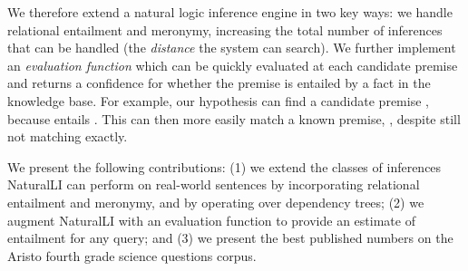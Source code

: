 We therefore extend a natural logic inference engine in two key ways:
  we handle relational entailment 
  and meronymy, increasing the total number of inferences that can be handled
  (the \textit{distance} the system can search).
We further implement an \textit{evaluation function} which can be quickly
  evaluated at each candidate premise
  and returns a confidence for
  whether the premise is entailed by a fact in the knowledge base.
For example, our hypothesis  can find
  a candidate premise , because 
  entails .
This can then more easily match a known premise, ,
  despite still not matching exactly.

We present the following contributions:
(1) we extend the classes of inferences NaturalLI can perform on real-world 
    sentences by
    incorporating relational entailment and meronymy, and by operating over 
    dependency trees;
(2) we augment NaturalLI with an evaluation function to provide an estimate of entailment
    for any query; and 
(3) we present the best
    published numbers on the Aristo fourth grade science questions corpus.


